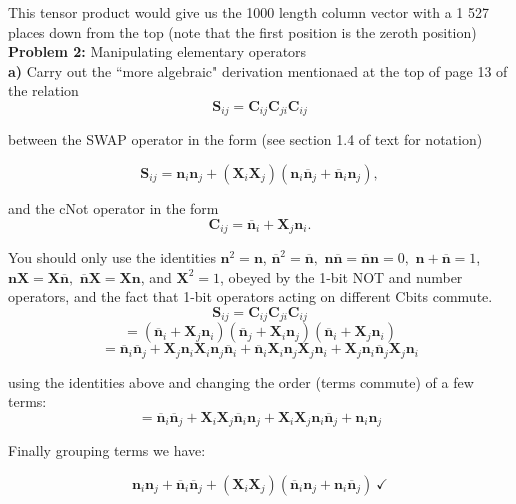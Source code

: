 This tensor product would give us the 1000 length column vector with a 1 527
places down from the top (note that the first position is the zeroth position)\\

\textbf{Problem 2:} Manipulating elementary operators\\
\textbf{a)} Carry out the ``more algebraic" derivation mentionaed at the top of
page 13 of the relation
$$\textbf{S}_{ij}=\textbf{C}_{ij}\textbf{C}_{ji}\textbf{C}_{ij}$$

between the SWAP operator in the form (see section 1.4 of text for notation)

$$\textbf{S}_{ij}=\textbf{n}_i\textbf{n}_j+(\textbf{X}_i\textbf{X}_j)(\textbf{n}_i\overline{\textbf{n}}_j+\overline{\textbf{n}}_i\textbf{n}_j),$$

and the cNot operator in the form
$$\textbf{C}_{ij}=\overline{\textbf{n}}_i+\textbf{X}_j\textbf{n}_i.$$

You should only use the identities $\textbf{n}^2=\textbf{n}$,
$\overline{\textbf{n}}^2=\overline{\textbf{n}},$
$\textbf{n}\overline{\textbf{n}}=\overline{\textbf{n}}\textbf{n}=0,$
$\textbf{n}+\overline{\textbf{n}}=1$,
$\textbf{n}\textbf{X}=\textbf{X}\overline{\textbf{n}},$
$\overline{\textbf{n}}\textbf{X}=\textbf{X}\textbf{n}$, and $\textbf{X}^2=1$,
obeyed by the 1-bit NOT and number operators, and the fact that 1-bit operators
acting on different Cbits commute.\\


$$\textbf{S}_{ij}=\textbf{C}_{ij}\textbf{C}_{ji}\textbf{C}_{ij}$$
$$=(\overline{\textbf{n}}_i+\textbf{X}_j\textbf{n}_i)(\overline{\textbf{n}}_j+\textbf{X}_i\textbf{n}_j)(\overline{\textbf{n}}_i+\textbf{X}_j\textbf{n}_i)$$
$$=\overline{\textbf{n}}_i\overline{\textbf{n}}_j
+\textbf{X}_j\textbf{n}_i\textbf{X}_i\textbf{n}_j\overline{\textbf{n}}_i
+\overline{\textbf{n}}_i\textbf{X}_i\textbf{n}_j\textbf{X}_j\textbf{n}_i+\textbf{X}_j\textbf{n}_i\overline{\textbf{n}}_j\textbf{X}_j\textbf{n}_i$$

using the identities above and changing the order (terms commute) of a few terms:
$$=\overline{\textbf{n}}_i\overline{\textbf{n}}_j
+\textbf{X}_i\textbf{X}_j\overline{\textbf{n}}_i\textbf{n}_j
+\textbf{X}_i\textbf{X}_j\textbf{n}_i\overline{\textbf{n}}_j
+\textbf{n}_i\textbf{n}_j$$

Finally grouping terms we have:

$$\textbf{n}_i\textbf{n}_j+\overline{\textbf{n}}_i\overline{\textbf{n}}_j+(\textbf{X}_i\textbf{X}_j)(\overline{\textbf{n}}_i\textbf{n}_j+\textbf{n}_i\overline{\textbf{n}}_j)~\checkmark$$

